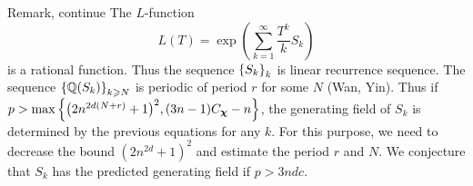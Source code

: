 \documentclass[aspectratio=169,handout]{beamer}
\newcommand\bchi{{\boldsymbol\chi}}
\begin{document}
\begin{frame}{Remark, continue}
The $L$-function 
	\[L(T)=\exp\left(\sum_{k=1}^\infty \frac{T^k}{k} S_k\right)\]
is a rational function.
Thus the sequence ${\left\{S_k\right\}}_k$ is linear recurrence sequence.
The sequence ${\left\{{\mathbb{Q}}(S_k)\right\}}_{k\geqslant N}$ is periodic of period $r$ for some $N$ (Wan, Yin).
Thus if $p>\max\set{\bigl(2n^{2d(N+r)}+1\bigr)^2,(3n-1)C_\bchi-n}$,  the generating field of $S_k$ is determined by the previous equations for any $k$.
For this purpose, we need to decrease the bound $(2n^{2d}+1)^2$ and estimate the period $r$ and $N$.
We conjecture that $S_k$ has the predicted generating field if $p>3ndc$.
\end{frame}
\end{document}
